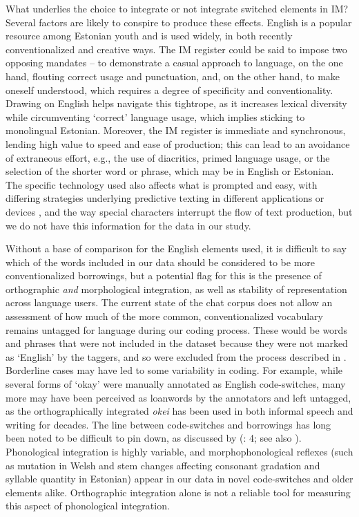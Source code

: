 \documentclass[output=paper]{langscibook}
\begin{document}
What underlies the choice to integrate or not integrate switched elements in IM? Several factors are likely to conspire to produce these effects. English is a popular resource among Estonian youth and is used widely, in both recently conventionalized and creative ways. The IM register could be said to impose two opposing mandates – to demonstrate a casual approach to language, on the one hand, flouting correct usage and punctuation, and, on the other hand, to make oneself understood, which requires a degree of specificity and conventionality. Drawing on English helps navigate this tightrope, as it increases lexical diversity while circumventing ‘correct’ language usage, which implies sticking to monolingual Estonian. Moreover, the IM register is immediate and synchronous, lending high value to speed and ease of production; this can lead to an avoidance of extraneous effort, e.g., the use of diacritics, primed language usage, or the selection of the shorter word or phrase, which may be in English or Estonian. The specific technology used also affects what is prompted and easy, with differing strategies underlying predictive texting in different applications or devices \citep{McCulloch2019}, and the way special characters interrupt the flow of text production, but we do not have this information for the data in our study.

Without a base of comparison for the English elements used, it is difficult to say which of the words included in our data should be considered to be more conventionalized borrowings, but a potential flag for this is the presence of orthographic \textit{and} morphological integration, as well as stability of representation across language users. The current state of the chat corpus does not allow an assessment of how much of the more common, conventionalized vocabulary remains untagged for language during our coding process. These would be words and phrases that were not included in the dataset because they were not marked as ‘English’ by the taggers, and so were excluded from the process described in . Borderline cases may have led to some variability in coding. For example, while several forms of ‘okay’ were manually annotated as English code-switches, many more may have been perceived as loanwords by the annotators and left untagged, as the orthographically integrated \textit{okei} has been used in both informal speech and writing for decades. The line between code-switches and borrowings has long been noted to be difficult to pin down, as discussed by \citeauthor{Deuchar2020} (\citeyear{Deuchar2020}: 4; see also \citealt{Bullock2009, Poplack2018}). Phonological integration is highly variable, and morphophonological reflexes (such as mutation in Welsh and stem changes affecting consonant gradation and syllable quantity in Estonian) appear in our data in novel code-switches and older elements alike. Orthographic integration alone is not a reliable tool for measuring this aspect of phonological integration.
\end{document}
